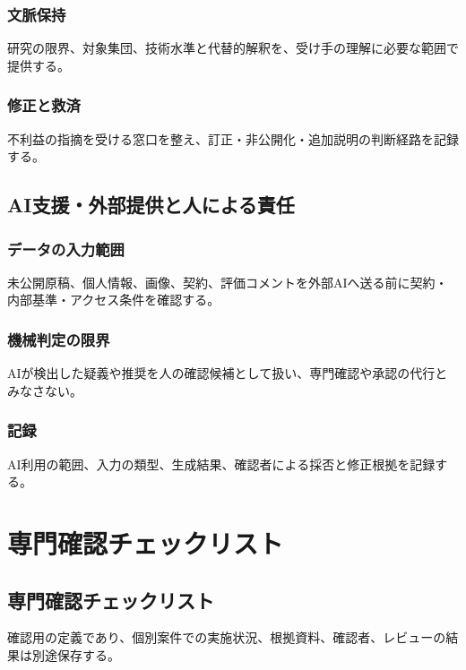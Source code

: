 \documentclass[a4paper,11pt]{article}
\begin{document}
\subsubsection{文脈保持}
\par 研究の限界、対象集団、技術水準と代替的解釈を、受け手の理解に必要な範囲で提供する。\par\medskip
\subsubsection{修正と救済}
\par 不利益の指摘を受ける窓口を整え、訂正・非公開化・追加説明の判断経路を記録する。\par\medskip
\subsection{AI支援・外部提供と人による責任}
\subsubsection{データの入力範囲}
\par 未公開原稿、個人情報、画像、契約、評価コメントを外部AIへ送る前に契約・内部基準・アクセス条件を確認する。\par\medskip
\subsubsection{機械判定の限界}
\par AIが検出した疑義や推奨を人の確認候補として扱い、専門確認や承認の代行とみなさない。\par\medskip
\subsubsection{記録}
\par AI利用の範囲、入力の類型、生成結果、確認者による採否と修正根拠を記録する。\par\medskip
\section{専門確認チェックリスト}
\subsection{専門確認チェックリスト}
\par 確認用の定義であり、個別案件での実施状況、根拠資料、確認者、レビューの結果は別途保存する。\par\medskip
\end{document}
